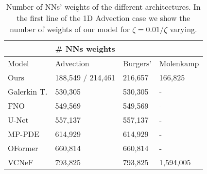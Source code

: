 \begin{table}[]
\begin{tabular}{llll}
\cline{2-4}
\multicolumn{1}{l|}{}                      & \multicolumn{3}{l|}{\# NNs weights }                                                                    \\ \hline
\multicolumn{1}{|l|}{Model}                & \multicolumn{1}{l|}{Advection}    & \multicolumn{1}{l|}{Burgers'} & \multicolumn{1}{l|}{Molenkamp} \\ \hline
\multicolumn{1}{|l|}{Ours}                 & \multicolumn{1}{l|}{188,549 / 214,461} & \multicolumn{1}{l|}{216,657}     & \multicolumn{1}{l|}{166,825}          \\ \hline
\multicolumn{1}{|l|}{Galerkin T.} & \multicolumn{1}{l|}{530,305}         & \multicolumn{1}{l|}{530,305}     & \multicolumn{1}{l|}{-}          \\ \hline
\multicolumn{1}{|l|}{FNO}                  & \multicolumn{1}{l|}{549,569}         & \multicolumn{1}{l|}{549,569}     & \multicolumn{1}{l|}{-}          \\ \hline
\multicolumn{1}{|l|}{U-Net}                & \multicolumn{1}{l|}{557,137}         & \multicolumn{1}{l|}{557,137}     & \multicolumn{1}{l|}{-}          \\ \hline
\multicolumn{1}{|l|}{MP-PDE}               & \multicolumn{1}{l|}{614,929}         & \multicolumn{1}{l|}{614,929}     & \multicolumn{1}{l|}{-}          \\ \hline
\multicolumn{1}{|l|}{OFormer}              & \multicolumn{1}{l|}{660,814}         & \multicolumn{1}{l|}{660,814}     & \multicolumn{1}{l|}{-}          \\ \hline
\multicolumn{1}{|l|}{VCNeF}                & \multicolumn{1}{l|}{793,825}         & \multicolumn{1}{l|}{793,825}     & \multicolumn{1}{l|}{1,594,005}          \\ \hline                         
\end{tabular}
\caption{Number of NNs' weights of the different architectures. In the first line of the 1D Advection case we show the number of weights of our model for $\zeta=0.01$/$\zeta$ varying.}
\label{tab:numb_weights}
\end{table}
